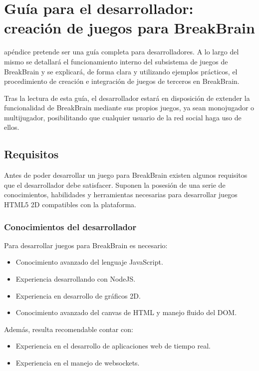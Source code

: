 \chapter{Guía para el desarrollador: creación de juegos para BreakBrain}
\label{chap::guia}

 apéndice pretende ser una guía completa para desarrolladores. A lo largo del mismo se detallará el funcionamiento interno del subsistema de juegos de BreakBrain y se explicará, de forma clara y utilizando ejemplos prácticos, el procedimiento de creación e integración de juegos de terceros en BreakBrain.

Tras la lectura de esta guía, el desarrollador estará en disposición de extender la funcionalidad de BreakBrain mediante sus propios juegos, ya sean monojugador o multijugador, posibilitando que cualquier usuario de la red social haga uso de ellos.

\section{Requisitos}

Antes de poder desarrollar un juego para BreakBrain existen algunos requisitos que el desarrollador debe satisfacer. Suponen la posesión de una serie de conocimientos, habilidades y herramientas necesarias para desarrollar juegos HTML5 2D compatibles con la plataforma.

\subsection{Conocimientos del desarrollador}

Para desarrollar juegos para BreakBrain es necesario:

\begin{itemize}
\item Conocimiento avanzado del lenguaje JavaScript.
\item Experiencia desarrollando con NodeJS.
\item Experiencia en desarrollo de gráficos 2D.
\item Conocimiento avanzado del canvas de \acs{HTML} y manejo fluido del \acs{DOM}.
\end{itemize}

Además, resulta recomendable contar con:

\begin{itemize}
\item Experiencia en el desarrollo de aplicaciones web de tiempo real.
\item Experiencia en el manejo de websockets.
\end{itemize}

